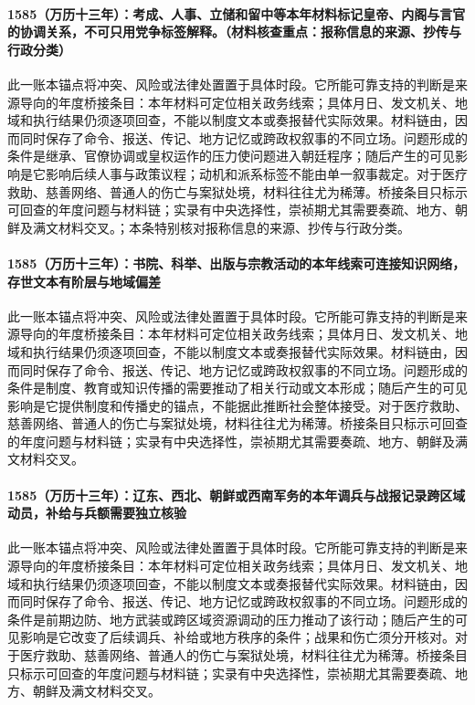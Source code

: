 \paragraph{1585（万历十三年）：考成、人事、立储和留中等本年材料标记皇帝、内阁与言官的协调关系，不可只用党争标签解释。（材料核查重点：报称信息的来源、抄传与行政分类）} 此一账本锚点将冲突、风险或法律处置置于具体时段。它所能可靠支持的判断是来源导向的年度桥接条目：本年材料可定位相关政务线索；具体月日、发文机关、地域和执行结果仍须逐项回查，不能以制度文本或奏报替代实际效果。材料链由，因而同时保存了命令、报送、传记、地方记忆或跨政权叙事的不同立场。问题形成的条件是继承、官僚协调或皇权运作的压力使问题进入朝廷程序；随后产生的可见影响是它影响后续人事与政策议程；动机和派系标签不能由单一叙事裁定。对于医疗救助、慈善网络、普通人的伤亡与案狱处境，材料往往尤为稀薄。桥接条目只标示可回查的年度问题与材料链；实录有中央选择性，崇祯期尤其需要奏疏、地方、朝鲜及满文材料交叉。；本条特别核对报称信息的来源、抄传与行政分类。

\paragraph{1585（万历十三年）：书院、科举、出版与宗教活动的本年线索可连接知识网络，存世文本有阶层与地域偏差} 此一账本锚点将冲突、风险或法律处置置于具体时段。它所能可靠支持的判断是来源导向的年度桥接条目：本年材料可定位相关政务线索；具体月日、发文机关、地域和执行结果仍须逐项回查，不能以制度文本或奏报替代实际效果。材料链由，因而同时保存了命令、报送、传记、地方记忆或跨政权叙事的不同立场。问题形成的条件是制度、教育或知识传播的需要推动了相关行动或文本形成；随后产生的可见影响是它提供制度和传播史的锚点，不能据此推断社会整体接受。对于医疗救助、慈善网络、普通人的伤亡与案狱处境，材料往往尤为稀薄。桥接条目只标示可回查的年度问题与材料链；实录有中央选择性，崇祯期尤其需要奏疏、地方、朝鲜及满文材料交叉。

\paragraph{1585（万历十三年）：辽东、西北、朝鲜或西南军务的本年调兵与战报记录跨区域动员，补给与兵额需要独立核验} 此一账本锚点将冲突、风险或法律处置置于具体时段。它所能可靠支持的判断是来源导向的年度桥接条目：本年材料可定位相关政务线索；具体月日、发文机关、地域和执行结果仍须逐项回查，不能以制度文本或奏报替代实际效果。材料链由，因而同时保存了命令、报送、传记、地方记忆或跨政权叙事的不同立场。问题形成的条件是前期边防、地方武装或跨区域资源调动的压力推动了该行动；随后产生的可见影响是它改变了后续调兵、补给或地方秩序的条件；战果和伤亡须分开核对。对于医疗救助、慈善网络、普通人的伤亡与案狱处境，材料往往尤为稀薄。桥接条目只标示可回查的年度问题与材料链；实录有中央选择性，崇祯期尤其需要奏疏、地方、朝鲜及满文材料交叉。

